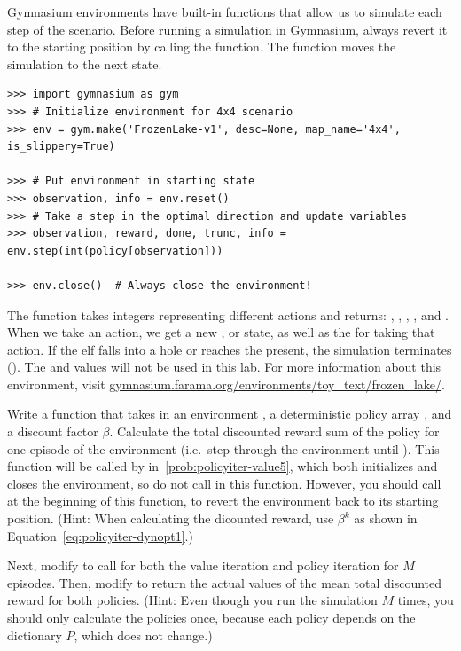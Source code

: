 Gymnasium environments have built-in functions that allow us to simulate each step of the scenario.
Before running a simulation in Gymnasium, always revert it to the starting position by calling the  function.
The function  moves the simulation to the next state.

\begin{lstlisting}
>>> import gymnasium as gym
>>> # Initialize environment for 4x4 scenario
>>> env = gym.make('FrozenLake-v1', desc=None, map_name='4x4', is_slippery=True)

>>> # Put environment in starting state
>>> observation, info = env.reset()
>>> # Take a step in the optimal direction and update variables
>>> observation, reward, done, trunc, info = env.step(int(policy[observation]))

>>> env.close()  # Always close the environment!
\end{lstlisting}

The function  takes integers representing different actions and returns: , , , , and .
When we take an action, we get a new , or state, as well as the  for taking that action.
If the elf falls into a hole or reaches the present, the simulation terminates ().
The  and  values will not be used in this lab.
For more information about this environment, visit \url{gymnasium.farama.org/environments/toy_text/frozen_lake/}.

\begin{problem}
\label{prob:policyiter-value6}
Write a function  that takes in an environment , a deterministic policy array , and a discount factor $\beta$.
Calculate the total discounted reward sum of the policy for one episode of the environment (i.e.\ step through the environment until ).
This function will be called by  in\ \ref{prob:policyiter-value5}, which both initializes and closes the environment, so do not call  in this function.
However, you should call\\  at the beginning of this function, to revert the environment back to its starting position.
(Hint: When calculating the dicounted reward, use $\beta^k$ as shown in Equation\ \ref{eq:policyiter-dynopt1}.)

Next, modify  to call  for both the value iteration and policy iteration for $M$ episodes.
Then, modify  to return the actual values of the mean total discounted reward for both policies.
(Hint: Even though you run the simulation $M$ times, you should only calculate the policies once, because each policy depends on the dictionary $P$, which does not change.)
\end{problem}

